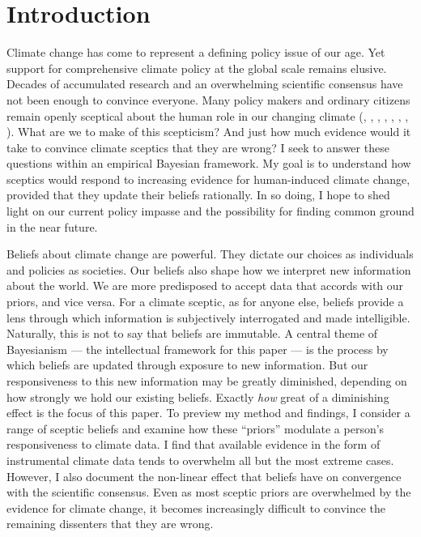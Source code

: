 \documentclass[smallextended]{svjour3}       %
\begin{document}
\hypertarget{sec:intro}{%
\section{Introduction}\label{sec:intro}}

Climate change has come to represent a defining policy issue of our age.
Yet support for comprehensive climate policy at the global scale remains
elusive. Decades of accumulated research and an overwhelming scientific
consensus have not been enough to convince everyone. Many policy makers
and ordinary citizens remain openly sceptical about the human role in
our changing climate (\cite{oreskes2004beyond},
\cite{anderegg2010expert}, \cite{doran2011examining},
\cite{cook2013quantifying}, \cite{verheggen2014scientists},
\cite{tol2014quantifying}, \cite{cook2016consensus},
\cite{saad2019americans}). What are we to make of this scepticism? And
just how much evidence would it take to convince climate sceptics that
they are wrong? I seek to answer these questions within an empirical
Bayesian framework. My goal is to understand how sceptics would respond
to increasing evidence for human-induced climate change, provided that
they update their beliefs rationally. In so doing, I hope to shed light
on our current policy impasse and the possibility for finding common
ground in the near future.

Beliefs about climate change are powerful. They dictate our choices as
individuals and policies as societies. Our beliefs also shape how we
interpret new information about the world. We are more predisposed to
accept data that accords with our priors, and vice versa. For a climate
sceptic, as for anyone else, beliefs provide a lens through which
information is subjectively interrogated and made intelligible.
Naturally, this is not to say that beliefs are immutable. A central
theme of Bayesianism --- the intellectual framework for this paper ---
is the process by which beliefs are updated through exposure to new
information. But our responsiveness to this new information may be
greatly diminished, depending on how strongly we hold our existing
beliefs. Exactly \emph{how} great of a diminishing effect is the focus
of this paper. To preview my method and findings, I consider a range of
sceptic beliefs and examine how these ``priors'' modulate a person's
responsiveness to climate data. I find that available evidence in the
form of instrumental climate data tends to overwhelm all but the most
extreme cases. However, I also document the non-linear effect that
beliefs have on convergence with the scientific consensus. Even as most
sceptic priors are overwhelmed by the evidence for climate change, it
becomes increasingly difficult to convince the remaining dissenters that
they are wrong.
\end{document}
